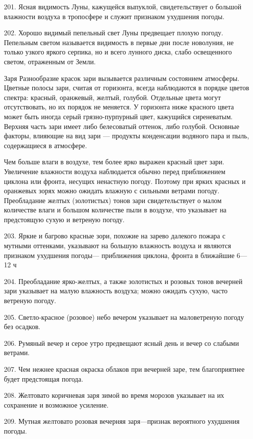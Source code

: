 201. Ясная видимость Луны, кажущейся выпуклой, свидетельствует о большой влажности воздуха в тропосфере и служит признаком ухудшения погоды.

202. Хорошо видимый пепельный свет Луны предвещает плохую погоду. Пепельным светом называется видимость в первые дни после новолуния, не только узкого яркого серпика, но и всего лунного диска, слабо освещенного светом, отраженным от Земли.

Заря
Разнообразие красок зари вызывается различным состоянием атмосферы. Цветные полосы зари, считая от горизонта, всегда наблюдаются в порядке цветов спектра: красный, оранжевый, желтый, голубой. Отдельные цвета могут отсутствовать, но их порядок не меняется. У горизонта ниже красного цвета может быть иногда серый грязно-пурпурный цвет, кажущийся сиреневатым. Верхняя часть зари имеет либо белесоватый оттенок, либо голубой. Основные факторы, влияющие на вид зари — продукты конденсации водяного пара и пыль, содержащиеся в атмосфере.

Чем больше влаги в воздухе, тем более ярко выражен красный цвет зари. Увеличение влажности воздуха наблюдается обычно перед приближением циклона или фронта, несущих ненастную погоду. Поэтому при ярких красных и оранжевых зорях можно ожидать влажную с сильными ветрами погоду. Преобладание желтых (золотистых) тонов зари свидетельствует о малом количестве влаги и большом количестве пыли в воздухе, что указывает на предстоящую сухую и ветреную погоду.

203. Яркие и багрово красные зори, похожие на зарево далекого пожара с мутными оттенками, указывают на большую влажность воздуха и являются признаком ухудшения погоды— приближения циклона, фронта в ближайшие 6—12 ч

204. Преобладание ярко-желтых, а также золотистых и розовых тонов вечерней зари указывает на малую влажность воздуха; можно ожидать сухую, часто ветреную погоду.

205. Светло-красное (розовое) небо вечером указывает на маловетреную погоду без осадков.

206. Румяный вечер и серое утро предвещают ясный день и вечер со слабыми ветрами.

207. Чем нежнее красная окраска облаков при вечерней заре, тем благоприятнее будет предстоящая погода.

208. Желтовато коричневая заря зимой во время морозов указывает на их сохранение и возможное усиление.

209. Мутная желтовато розовая вечерняя заря—признак вероятного ухудшения погоды.

